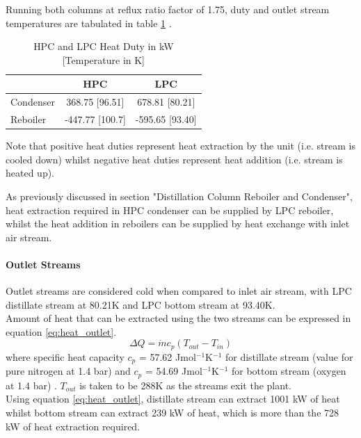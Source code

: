 \documentclass[11pt,oneside]{article}
\let\subsubsubsection\paragraph
\begin{document}
		\noindent Running both columns at reflux ratio factor of 1.75, duty and outlet stream temperatures are tabulated in table \ref{table:duty} \citep{nist}.
		\begin{table}[H]
        \centering
            \singlespacing
	        \caption{HPC and LPC Heat Duty in kW [Temperature in K]}
	        \label{table:duty}
	
	        \begin{tabular}{|l|cc|}
	        \hline
    	                    & HPC	            & LPC \\    \hline
	        Condenser		& 368.75 [96.51]	& 678.81 [80.21] \\
	        Reboiler  		& -447.77 [100.7]	& -595.65 [93.40] \\    \hline
	        \end{tabular}
	        \vspace{1ex}
	        
	        \raggedright Note that positive heat duties represent heat extraction by the unit (i.e. stream is cooled down) whilst negative heat duties represent heat addition (i.e. stream is heated up).
        \end{table}
        \noindent As previously discussed in section "Distillation Column Reboiler and Condenser", heat extraction required in HPC condenser can be supplied by LPC reboiler, whilst the heat addition in reboilers can be supplied by heat exchange with inlet air stream.
	    \subsubsubsection{Outlet Streams}
	    Outlet streams are considered cold when compared to inlet air stream, with LPC distillate stream at 80.21K and LPC bottom stream at 93.40K. \\
	    Amount of heat that can be extracted using the two streams can be expressed in equation \ref{eq:heat_outlet}.
	    \begin{equation}
	        \Delta Q = \dot{m}c_p \left(T_{out} - T_{in}\right)
	        \label{eq:heat_outlet}
	    \end{equation}
        where specific heat capacity $c_p$ = 57.62 Jmol$^{-1}$K$^{-1}$ for distillate stream (value for pure nitrogen at 1.4 bar) and $c_p$ = 54.69 Jmol$^{-1}$K$^{-1}$ for bottom stream (oxygen at 1.4 bar) \citep{nist}. $T_{out}$ is taken to be 288K as the streams exit the plant. \\
        Using equation \ref{eq:heat_outlet}, distillate stream can extract 1001 kW of heat whilst bottom stream can extract 239 kW of heat, which is more than the 728 kW of heat extraction required.
\end{document}
